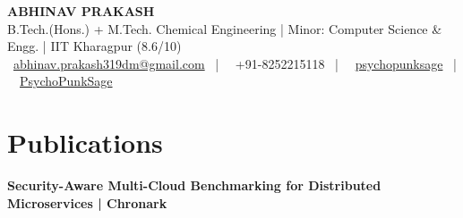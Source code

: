 \documentclass[11pt,a4paper]{article}
\newcommand{\beforeheaderskip}{-15pt}
\newcommand{\normalfontsize}{\small}
\newcommand{\education}[4]{
  \textbf{#1} & \textbf{#2} & #3 & #4 \\
}
\begin{document}
\vspace*{\beforeheaderskip}

\begin{center}
    {\normalfontsize\textbf{\color{headercolor}ABHINAV PRAKASH}} \\[1pt]
    {\footnotesize B.Tech.(Hons.) + M.Tech. Chemical Engineering | Minor: Computer Science \& Engg. | IIT Kharagpur (8.6/10)} \\[1pt]
    {\footnotesize 
    \faEnvelope\ \href{mailto:abhinav.prakash319dm@gmail.com}{abhinav.prakash319dm@gmail.com} \ | \ 
    \faPhone\ +91-8252215118 \ | \ 
    \faLinkedin\ \href{https://linkedin.com/in/psychopunksage}{psychopunksage} \ | \ 
    \faGithub\ \href{https://github.com/PsychoPunkSage}{PsychoPunkSage}
    }
\end{center}


\section*{Publications}
\textbf{Security-Aware Multi-Cloud Benchmarking for Distributed Microservices | Chronark}
\end{document}
